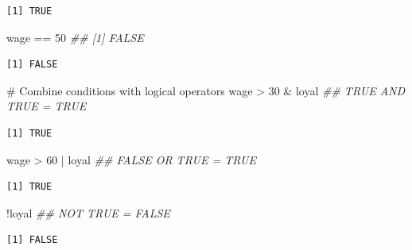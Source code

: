\documentclass[
  letterpaper,
  DIV=11,
  numbers=noendperiod]{scrreprt}
\newenvironment{Shaded}{\begin{snugshade}}{\end{snugshade}}
\newcommand{\CommentTok}[1]{\textcolor[rgb]{0.37,0.37,0.37}{#1}}
\newcommand{\DecValTok}[1]{\textcolor[rgb]{0.68,0.00,0.00}{#1}}
\newcommand{\DocumentationTok}[1]{\textcolor[rgb]{0.37,0.37,0.37}{\textit{#1}}}
\newcommand{\FunctionTok}[1]{\textcolor[rgb]{0.28,0.35,0.67}{#1}}
\newcommand{\NormalTok}[1]{\textcolor[rgb]{0.00,0.23,0.31}{#1}}
\newcommand{\SpecialCharTok}[1]{\textcolor[rgb]{0.37,0.37,0.37}{#1}}
\begin{document}
\begin{verbatim}
[1] TRUE
\end{verbatim}

\begin{Shaded}
\begin{Highlighting}[]
\NormalTok{wage }\SpecialCharTok{==} \DecValTok{50}  \DocumentationTok{\#\# [1] FALSE}
\end{Highlighting}
\end{Shaded}

\begin{verbatim}
[1] FALSE
\end{verbatim}

\begin{Shaded}
\begin{Highlighting}[]
\CommentTok{\# Combine conditions with logical operators}
\NormalTok{wage }\SpecialCharTok{\textgreater{}} \DecValTok{30} \SpecialCharTok{\&}\NormalTok{ loyal  }\DocumentationTok{\#\# TRUE AND TRUE  = TRUE}
\end{Highlighting}
\end{Shaded}

\begin{verbatim}
[1] TRUE
\end{verbatim}

\begin{Shaded}
\begin{Highlighting}[]
\NormalTok{wage }\SpecialCharTok{\textgreater{}} \DecValTok{60} \SpecialCharTok{|}\NormalTok{ loyal  }\DocumentationTok{\#\# FALSE OR TRUE  = TRUE}
\end{Highlighting}
\end{Shaded}

\begin{verbatim}
[1] TRUE
\end{verbatim}

\begin{Shaded}
\begin{Highlighting}[]
\SpecialCharTok{!}\NormalTok{loyal  }\DocumentationTok{\#\# NOT TRUE       = FALSE}
\end{Highlighting}
\end{Shaded}

\begin{verbatim}
[1] FALSE
\end{verbatim}

\begin{Shaded}
\end{Shaded}
\end{document}

